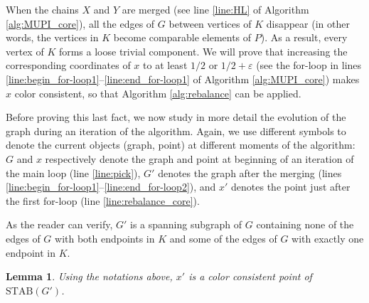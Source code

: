 \documentclass{article} \usepackage{fullpage}
\newtheorem{lemma}{Lemma}
\newcommand{\STAB}{\mathrm{STAB}}
\begin{document}
When the chains $X$ and $Y$ are merged (see line \ref{line:HL} of Algorithm \ref{alg:MUPI_core}), all the edges of $G$ between vertices of $K$ disappear (in other words, the vertices in $K$ become comparable elements of $P$). As a result, every vertex of $K$ forms a loose trivial component. We will prove that increasing the corresponding coordinates of $x$ to at least $1/2$ or $1/2 + \varepsilon$ (see the for-loop in lines \ref{line:begin_for-loop1}--\ref{line:end_for-loop1} of Algorithm \ref{alg:MUPI_core}) makes $x$ color consistent, so that Algorithm \ref{alg:rebalance} can be applied.

Before proving this last fact, we now study in more detail the evolution of the graph during an iteration of the algorithm. Again, we use different symbols to denote the current objects (graph, point) at different moments of the algorithm: $G$ and $x$ respectively denote the graph and point at beginning of an iteration of the main loop (line \ref{line:pick}), $G'$ denotes the graph after the merging (lines \ref{line:begin_for-loop1}--\ref{line:end_for-loop2}), and $x'$ denotes the point just after the first for-loop (line \ref{line:rebalance_core}).

As the reader can verify, $G'$ is a spanning subgraph of $G$ containing none of the edges of $G$ with both endpoints in $K$ and some of the edges of $G$ with exactly one endpoint in $K$.



\begin{lemma}
\label{lem:MUPI_colors}
Using the notations above, $x'$ is a color consistent point of $\STAB(G')$.
\end{lemma}
\end{document}
